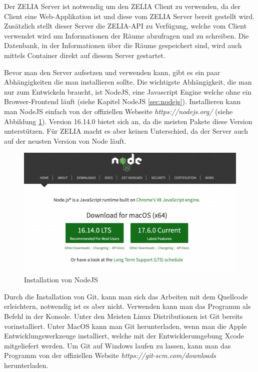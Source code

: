 
Der ZELIA Server ist notwendig um den ZELIA Client zu verwenden, da der Client eine Web-Applikation ist und diese vom ZELIA Server bereit gestellt wird. Zusätzlich stellt dieser Server die ZELIA-API zu Verfügung, welche vom Client verwendet wird um Informationen der Räume abzufragen und zu schreiben. Die Datenbank, in der Informationen über die Räume gespeichert sind, wird auch mittels Container direkt auf diesem Server gestartet.



Bevor man den Server aufsetzen und verwenden kann, gibt es ein paar Abhängigkeiten die man installieren sollte. Die wichtigste Abhängigkeit, die man nur zum Entwickeln braucht, ist NodeJS, eine Javascript Engine welche ohne ein Browser-Frontend läuft (siehe Kapitel NodeJS \ref{sec:nodejs}). Installieren kann man NodeJS einfach von der offiziellen Webseite \emph{https://nodejs.org/} (siehe Abbildung \ref{fig:nodejsdownload}). Version 16.14.0 bietet sich an, da die meisten Pakete diese Version unterstützen. Für ZELIA macht es aber keinen Unterschied, da der Server auch auf der neusten Version von Node läuft.

\begin{figure}[H]
    \centering
    \includegraphics[width=120mm]{media/Handbuch/nodejs.png}
    \caption{Installation von NodeJS}
    \label{fig:nodejsdownload}
\end{figure}


Durch die Installation von Git, kann man sich das Arbeiten mit dem Quellcode erleichtern, notwendig ist es aber nicht. Verwenden kann man das Programm als Befehl in der Konsole. Unter den Meisten Linux Distributionen ist Git bereits vorinstalliert. Unter MacOS kann man Git herunterladen, wenn man die Apple Entwicklungswerkzeuge installiert, welche mit der Entwicklerumgebung Xcode mitgeliefert werden. Um Git auf Windows laufen zu lassen, kann man das Programm von der offiziellen Website \emph{https://git-scm.com/downloads} herunterladen.

